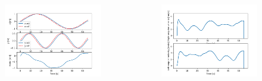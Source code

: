 \documentclass{beamer}
\begin{document}
\begin{frame}[allowframebreaks]
\begin{columns}
\vspace{-1em}

\begin{figure}[H]
    \centering
    \includegraphics[scale=0.3]{img/kin_screenshots/Pose.png}
\end{figure}


\vspace{-2em}

\begin{figure}[H]
    \centering
    \includegraphics[scale=0.3]{img/kin_screenshots/Wheels_Velocities.png}
\end{figure}

\vspace{-1em}


\end{columns}
\end{frame}
\end{document}
